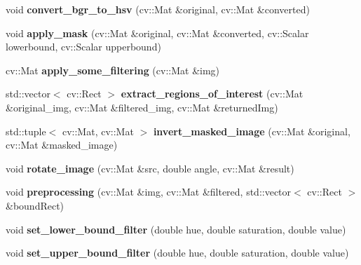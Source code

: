 \begin{DoxyCompactItemize}
\mbox{\label{class_character___recognition___algorithm_ab393524887755e6e363d281856b8aa1e}} 
void {\bfseries convert\+\_\+bgr\+\_\+to\+\_\+hsv} (cv\+::\+Mat \&original, cv\+::\+Mat \&converted)
\item 
\mbox{\label{class_character___recognition___algorithm_af84b6a4dad5edcf27f65d5dbc884efb2}} 
void {\bfseries apply\+\_\+mask} (cv\+::\+Mat \&original, cv\+::\+Mat \&converted, cv\+::\+Scalar lowerbound, cv\+::\+Scalar upperbound)
\item 
\mbox{\label{class_character___recognition___algorithm_a5f8eaa507a9b61ba71d361e2306d0110}} 
cv\+::\+Mat {\bfseries apply\+\_\+some\+\_\+filtering} (cv\+::\+Mat \&img)
\item 
\mbox{\label{class_character___recognition___algorithm_a21924694ba0aacb82054ea33191cb52a}} 
std\+::vector$<$ cv\+::\+Rect $>$ {\bfseries extract\+\_\+regions\+\_\+of\+\_\+interest} (cv\+::\+Mat \&original\+\_\+img, cv\+::\+Mat \&filtered\+\_\+img, cv\+::\+Mat \&returned\+Img)
\item 
\mbox{\label{class_character___recognition___algorithm_a75ff23b5b2722c9c572091755985e137}} 
std\+::tuple$<$ cv\+::\+Mat, cv\+::\+Mat $>$ {\bfseries invert\+\_\+masked\+\_\+image} (cv\+::\+Mat \&original, cv\+::\+Mat \&masked\+\_\+image)
\item 
\mbox{\label{class_character___recognition___algorithm_a4f7714bd67ad5804c909859b8eb5b8c6}} 
void {\bfseries rotate\+\_\+image} (cv\+::\+Mat \&src, double angle, cv\+::\+Mat \&result)
\item 
\mbox{\label{class_character___recognition___algorithm_a7642ccec81710fa52c553c13dcf7e0ca}} 
void {\bfseries preprocessing} (cv\+::\+Mat \&img, cv\+::\+Mat \&filtered, std\+::vector$<$ cv\+::\+Rect $>$ \&bound\+Rect)
\item 
\mbox{\label{class_character___recognition___algorithm_a06c2a31ba8f4ab6e3aacea6b643a4d7d}} 
void {\bfseries set\+\_\+lower\+\_\+bound\+\_\+filter} (double hue, double saturation, double value)
\item 
\mbox{\label{class_character___recognition___algorithm_a2add4eeeb34fb3a8bd35a1d5da0950a0}} 
void {\bfseries set\+\_\+upper\+\_\+bound\+\_\+filter} (double hue, double saturation, double value)
\end{DoxyCompactItemize}

